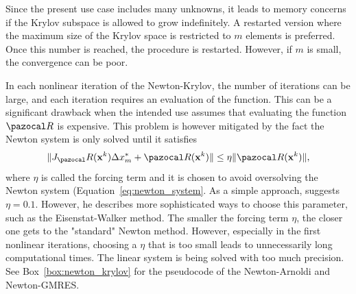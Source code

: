 Since the present use case includes many unknowns, it leads to memory concerns if the Krylov subspace is allowed to grow indefinitely.
A restarted version where the maximum size of the Krylov space is restricted to \(m\) elements is preferred.
Once this number is reached, the procedure is restarted.
However, if \(m\) is small, the convergence can be poor.

In each nonlinear iteration of the Newton-Krylov, the number of iterations can be large, and each iteration requires an evaluation of the function.
This can be a significant drawback when the intended use assumes that evaluating the function \(\pazocal R\) is expensive.
This problem is however mitigated by the fact the Newton system is only solved until it satisfies
\begin{equation}
  \|J_\pazocal R(\mathbf x^k) \Delta x^*_m+ \pazocal R(\mathbf x^k)\| \leq \eta\|\pazocal R(\mathbf x^k)\|,
\end{equation}
where \(\eta\) is called the forcing term and it is chosen to avoid oversolving the Newton system (Equation~\eqref{eq:newton_system}.
As a simple approach, \cite{kelley_solving_2003} suggests \(\eta=0.1\). However, he describes more sophisticated ways to choose this parameter, such as the Eisenstat-Walker method.
The smaller the forcing term \(\eta\), the closer one gets to the "standard" Newton method.
However, especially in the first nonlinear iterations, choosing a \(\eta\) that is too small leads to unnecessarily long computational times. The linear system is being solved with too much precision.
See Box~\ref{box:newton_krylov} for the pseudocode of the Newton-Arnoldi and Newton-GMRES.


